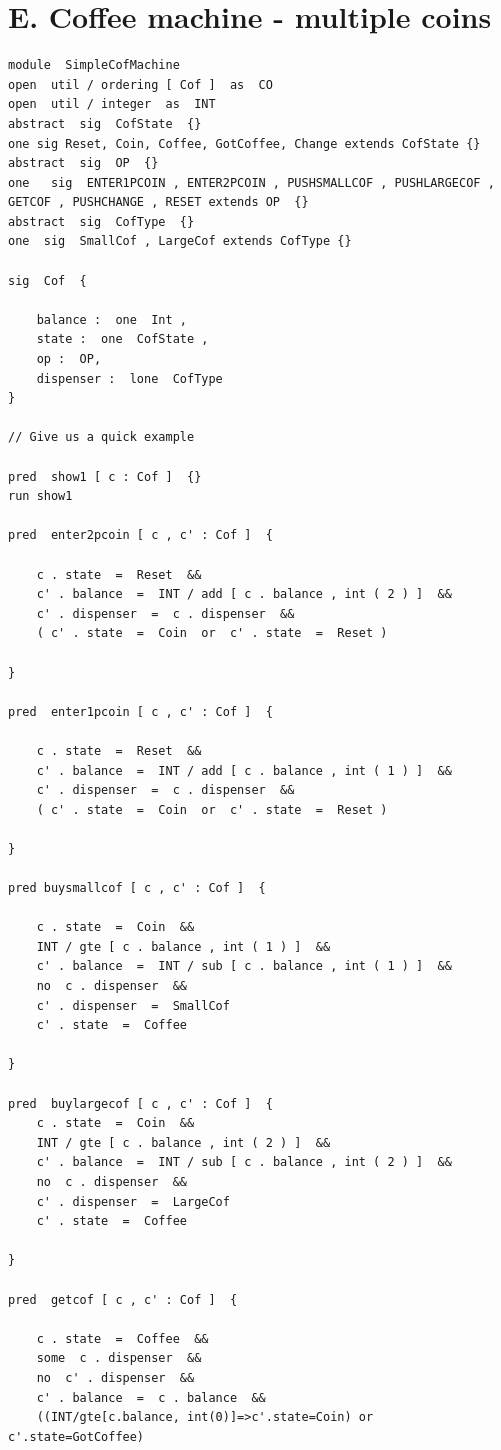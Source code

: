 \documentclass[a4paper,10pt]{report}
\begin{document}
\section{E. Coffee machine - multiple coins}
\begin{verbatim}
module  SimpleCofMachine
open  util / ordering [ Cof ]  as  CO
open  util / integer  as  INT
abstract  sig  CofState  {}
one sig Reset, Coin, Coffee, GotCoffee, Change extends CofState {}
abstract  sig  OP  {}
one   sig  ENTER1PCOIN , ENTER2PCOIN , PUSHSMALLCOF , PUSHLARGECOF ,
GETCOF , PUSHCHANGE , RESET extends OP  {}
abstract  sig  CofType  {}
one  sig  SmallCof , LargeCof extends CofType {}

sig  Cof  {

	balance :  one  Int ,
	state :  one  CofState ,
	op :  OP,
	dispenser :  lone  CofType
}

// Give us a quick example

pred  show1 [ c : Cof ]  {}
run show1

pred  enter2pcoin [ c , c' : Cof ]  {

	c . state  =  Reset  &&
	c' . balance  =  INT / add [ c . balance , int ( 2 ) ]  &&
	c' . dispenser  =  c . dispenser  &&
	( c' . state  =  Coin  or  c' . state  =  Reset )
	
}

pred  enter1pcoin [ c , c' : Cof ]  {

	c . state  =  Reset  &&
	c' . balance  =  INT / add [ c . balance , int ( 1 ) ]  &&
	c' . dispenser  =  c . dispenser  &&
	( c' . state  =  Coin  or  c' . state  =  Reset )

}

pred buysmallcof [ c , c' : Cof ]  {

	c . state  =  Coin  &&
	INT / gte [ c . balance , int ( 1 ) ]  &&
	c' . balance  =  INT / sub [ c . balance , int ( 1 ) ]  &&
	no  c . dispenser  &&
	c' . dispenser  =  SmallCof
	c' . state  =  Coffee

}

pred  buylargecof [ c , c' : Cof ]  {
	c . state  =  Coin  &&
	INT / gte [ c . balance , int ( 2 ) ]  &&
	c' . balance  =  INT / sub [ c . balance , int ( 2 ) ]  &&
	no  c . dispenser  &&
	c' . dispenser  =  LargeCof
	c' . state  =  Coffee

}

pred  getcof [ c , c' : Cof ]  {

	c . state  =  Coffee  &&
	some  c . dispenser  &&
	no  c' . dispenser  &&
	c' . balance  =  c . balance  &&
	((INT/gte[c.balance, int(0)]=>c'.state=Coin) or c'.state=GotCoffee)
	

\end{verbatim}
\end{document}
